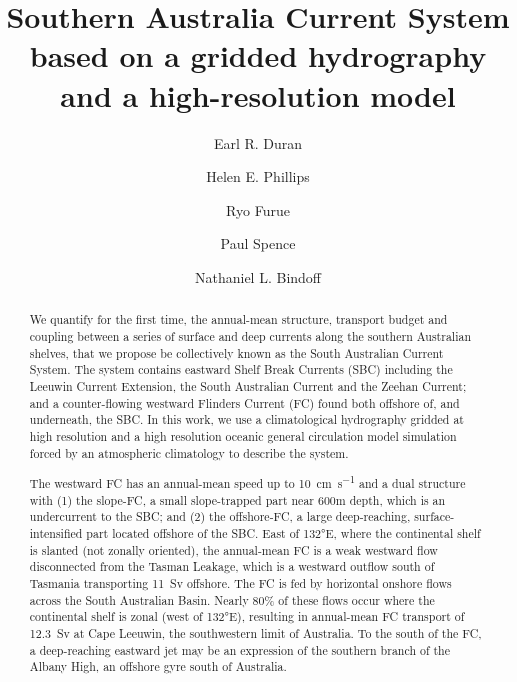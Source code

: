 \documentclass[preprint,3p,review,12pt]{elsarticle}
\begin{document}
\begin{frontmatter}

\title{Southern Australia Current System based on a gridded hydrography and a high-resolution model}

\author[label2]{Earl R. Duran}
\author[label3,label4]{Helen E. Phillips}
\author[label5]{Ryo Furue}
\author[label2,label4]{Paul Spence}
\author[label3,label4,label6,label7]{Nathaniel L. Bindoff}

\address[label2]{Climate Change Research Centre (CCRC), University of New South Wales, Sydney, NSW 2052 Australia}
\address[label3]{Institute for Marine and Antarctic Studies (IMAS), Hobart, Tasmania, Australia}
\address[label4]{ARC Centre of Excellence for Climate Extremes (CLEX)}\address[label5]{Japan Agency for Marine-Earth Science and Technology (JAMSTEC), Yokohama, Japan}
\address[label6]{Commonwealth Scientific and Industrial Research Organisation (CSIRO)}
\address[label7]{Antarctic Climate and Ecosystems Cooperative Research Centre (ACE CRC), Hobart, Tasmania, Australia}


\begin{abstract}
We quantify for the first time, the annual-mean structure, transport budget and coupling between a series of surface and deep currents along the southern Australian shelves, that we propose be collectively known as the South Australian Current System. The system contains eastward Shelf Break Currents (SBC) including the Leeuwin Current Extension, the South Australian Current and the Zeehan Current; and a counter-flowing westward Flinders Current (FC) found both offshore of, and underneath, the SBC\@.
In this work, we use a climatological hydrography gridded at high resolution and a high resolution oceanic general circulation model simulation forced by an atmospheric climatology to describe the system.

The westward FC has an annual-mean speed up to \SI{10}{\centi\meter\per\second} and a dual structure with (1) the slope-FC, a small slope-trapped part near 600m depth, which is an undercurrent to the SBC; and (2) the offshore-FC, a large deep-reaching, surface-intensified part located offshore of the SBC\@.
East of \ang{132}E, where the continental shelf is slanted (not zonally oriented), the annual-mean FC is a weak westward flow disconnected from the Tasman Leakage, which is a westward outflow south of Tasmania transporting \SI{11}{Sv} offshore.
The FC is fed by horizontal onshore flows across the South Australian Basin. Nearly 80\% of these flows occur where the continental shelf is zonal (west of \ang{132}E), resulting in annual-mean FC transport of \SI{12.3}{Sv} at Cape Leeuwin, the southwestern limit of Australia.
To the south of the FC, a deep-reaching eastward jet may be an expression of the southern branch of the Albany High, an offshore gyre south of Australia.


\end{abstract}
\end{frontmatter}
\end{document}

